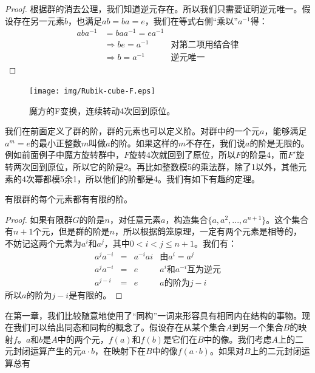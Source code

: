 \documentclass{article}
\begin{document}
\begin{proof}
根据群的消去公理，我们知道逆元存在。所以我们只需要证明逆元唯一。假设存在另一元素$b$，也满足$ab = ba = e$，我们在等式右侧“乘以”$a^{-1}$得：
\[
\begin{array}{rll}
aba^{-1} & = baa^{-1} = ea^{-1} & \\
& \Rightarrow be = a^{-1} & \text{对第二项用结合律} \\
& \Rightarrow b = a^{-1} & \text{逆元唯一}
\end{array}
\]
\end{proof}

\begin{figure}[htbp]
 \centering
 \texttt{[image: img/Rubik-cube-F.eps]}
 \caption{魔方的F变换，连续转动4次回到原位。}
 \label{fig:Rubik-cube-F}
\end{figure}

我们在前面定义了群的阶，群的元素也可以定义阶。对群中的一个元$a$，能够满足$a^m = e$的最小正整数$m$叫做$a$的阶。如果这样的$m$不存在，我们说$a$的阶是无限的。例如前面例子中魔方旋转群中，$F$旋转4次就回到了原位，所以$F$的阶是4，而$F'$旋转两次回到原位，所以它的阶是2。再比如整数模5的乘法群，除了1以外，其他元素的4次幂都模5余1，所以他们的阶都是4。我们有如下有趣的定理。

\begin{theorem}
有限群的每个元素都有有限的阶。
\end{theorem}

\begin{proof}
如果有限群$G$的阶是$n$，对任意元素$a$，构造集合$\{a, a^2, ..., a^{n+1}\}$。这个集合有$n+1$个元，但是群的阶是$n$，所以根据鸽笼原理，一定有两个元素是相等的， 不妨记这两个元素为$a^i$和$a^j$，其中$0 < i < j \leq n + 1$。我们有：
\[
\begin{array}{rcll}
a^ja^{-i} & = & a^{-i}a{i} & \text{由} a^i = a^j \\
a^ja^{-i} & = & e & \text{$a^i$和$a^{-i}$互为逆元} \\
a^{j-i} & = & e & a\text{的阶为} j - i
\end{array}
\]
所以$a$的阶为$j-i$是有限的。
\end{proof}

在第一章，我们比较随意地使用了“同构”一词来形容具有相同内在结构的事物。现在我们可以给出同态和同构的概念了。假设存在从某个集合$A$到另一个集合$B$的映射$f$。$a$和$b$是$A$中的两个元，$f(a)$和$f(b)$是它们在$B$中的像。我们考虑$A$上的二元封闭运算产生的元$a \cdot b$，在映射下在$B$中的像$f(a \cdot b)$。如果对$B$上的二元封闭运算总有
\end{document}
